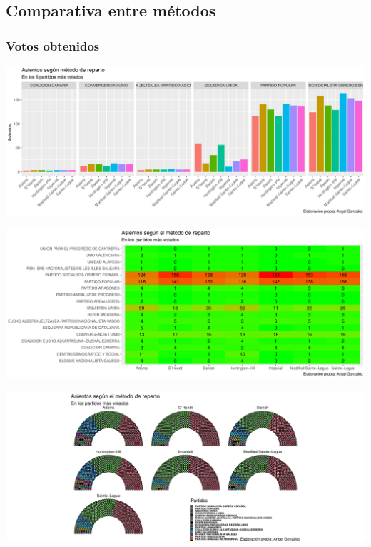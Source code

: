 \documentclass[12pt,a4paper,]{book}
\numberwithin{dummy}{section}
\theoremstyle{ocrenumbox}
\theoremstyle{blacknumex}
\theoremstyle{blacknumbox}
\theoremstyle{ocrenum}
\theoremstyle{ocrenum}
\begin{document}
\hypertarget{comparativa-entre-muxe9todos-5}{%
\subsection{Comparativa entre
métodos}\label{comparativa-entre-muxe9todos-5}}

\hypertarget{votos-obtenidos-5}{%
\subsubsection{Votos obtenidos}\label{votos-obtenidos-5}}

\begin{center}\includegraphics[width=0.95\linewidth]{figurasR/unnamed-chunk-104-1} \end{center}

\begin{center}\includegraphics[width=0.95\linewidth]{figurasR/unnamed-chunk-104-2} \end{center}

\begin{center}\includegraphics[width=0.95\linewidth]{figurasR/unnamed-chunk-104-3} \end{center}
\end{document}
